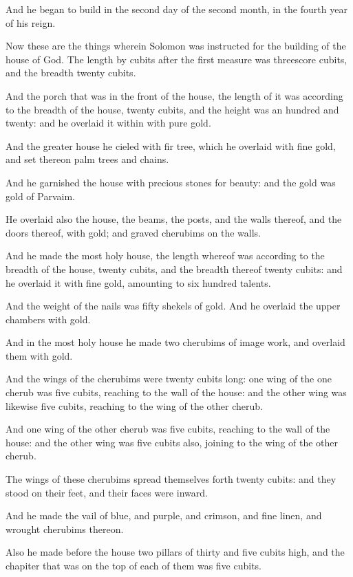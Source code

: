 \verse And he began to build in the second day of the second month, in the fourth year of his reign.

\verse Now these are the things wherein Solomon was instructed for the building of the house of God. The length by cubits after the first measure was threescore cubits, and the breadth twenty cubits.

\verse And the porch that was in the front of the house, the length of it was according to the breadth of the house, twenty cubits, and the height was an hundred and twenty: and he overlaid it within with pure gold.

\verse And the greater house he cieled with fir tree, which he overlaid with fine gold, and set thereon palm trees and chains.

\verse And he garnished the house with precious stones for beauty: and the gold was gold of Parvaim.

\verse He overlaid also the house, the beams, the posts, and the walls thereof, and the doors thereof, with gold; and graved cherubims on the walls.

\verse And he made the most holy house, the length whereof was according to the breadth of the house, twenty cubits, and the breadth thereof twenty cubits: and he overlaid it with fine gold, amounting to six hundred talents.

\verse And the weight of the nails was fifty shekels of gold. And he overlaid the upper chambers with gold.

\verse And in the most holy house he made two cherubims of image work, and overlaid them with gold.

\verse And the wings of the cherubims were twenty cubits long: one wing of the one cherub was five cubits, reaching to the wall of the house: and the other wing was likewise five cubits, reaching to the wing of the other cherub.

\verse And one wing of the other cherub was five cubits, reaching to the wall of the house: and the other wing was five cubits also, joining to the wing of the other cherub.

\verse The wings of these cherubims spread themselves forth twenty cubits: and they stood on their feet, and their faces were inward.

\verse And he made the vail of blue, and purple, and crimson, and fine linen, and wrought cherubims thereon.

\verse Also he made before the house two pillars of thirty and five cubits high, and the chapiter that was on the top of each of them was five cubits.

